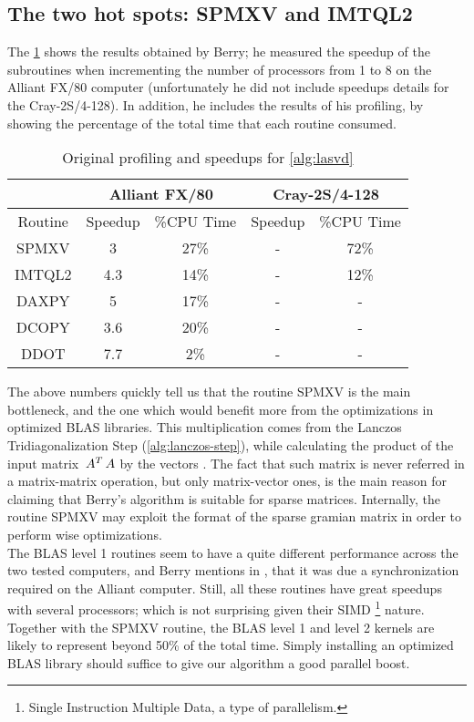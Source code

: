 \subsection{The two hot spots: SPMXV and IMTQL2}

The \cref{tab:lasvd-prof} shows the results obtained by Berry; he
measured 
the speedup of the subroutines when incrementing the number of
processors from 1 to 8 on the Alliant FX/80 computer (unfortunately he
did not include speedups details for the Cray-2S/4-128). In addition,
he includes the results of his profiling, by showing the percentage of
the total time that each routine consumed. \\

\begin{table}[!h]
\caption{Original profiling and speedups for \cref{alg:lasvd}}
\label{tab:lasvd-prof}
\begin{center}
\begin{tabular}{|c|c|c|c|c|}
\hline
& \multicolumn{2}{|c|}{Alliant FX/80} & \multicolumn{2}{|c|}{Cray-2S/4-128} \\
\hline
Routine & Speedup & \%CPU Time & Speedup & \%CPU Time \\
\hline
\hline
SPMXV & 3 & 27\% & - & 72\% \\
\hline
IMTQL2 & 4.3 & 14\% & - & 12\% \\
\hline
DAXPY & 5 & 17\% & - & - \\
\hline
DCOPY & 3.6 & 20\% & - & - \\
\hline
DDOT & 7.7 & 2\% & - & - \\
\hline
\hline
\end{tabular}
\end{center}
\end{table}

The above numbers quickly tell us that the routine SPMXV is the main
bottleneck, and the one which would benefit more from the
optimizations in optimized BLAS libraries. This multiplication comes
from the Lanczos Tridiagonalization Step (\cref{alg:lanczos-step}),
while calculating the product of the input matrix $\,{A}^{T}\,A$ by the
vectors . The fact that such matrix is never referred in a
matrix-matrix operation, but only matrix-vector ones, is the main
reason for claiming that Berry's algorithm is suitable for sparse
matrices. Internally, the routine SPMXV may exploit the 
format of the sparse gramian matrix in order to perform wise
optimizations. \\

The BLAS level 1 routines seem to have a quite different performance
across the two tested computers, and Berry mentions in \cite{berry91},
that it was due a synchronization required on the Alliant
computer. Still, all these routines have great speedups with several
processors; which is not surprising given their SIMD \footnote{Single
  Instruction Multiple Data, a type of parallelism.} nature. Together with the
SPMXV routine, the BLAS level 1 and level 2 kernels are likely to
represent beyond 50\% of the total time. Simply installing an
optimized BLAS library should suffice to give our algorithm a good
parallel boost. \\

